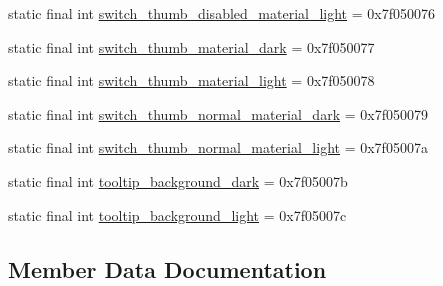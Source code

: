 \begin{DoxyCompactItemize}
\item 
static final int \mbox{\hyperlink{classandroid_1_1support_1_1v7_1_1appcompat_1_1R_1_1color_a489562997ece3fe0de5f8ab8e70813f2}{switch\+\_\+thumb\+\_\+disabled\+\_\+material\+\_\+light}} = 0x7f050076
\item 
static final int \mbox{\hyperlink{classandroid_1_1support_1_1v7_1_1appcompat_1_1R_1_1color_ab3f5b30d869ad8079583dcb3ca70c48a}{switch\+\_\+thumb\+\_\+material\+\_\+dark}} = 0x7f050077
\item 
static final int \mbox{\hyperlink{classandroid_1_1support_1_1v7_1_1appcompat_1_1R_1_1color_a7c510dd45c37c40591c33a8e683bba44}{switch\+\_\+thumb\+\_\+material\+\_\+light}} = 0x7f050078
\item 
static final int \mbox{\hyperlink{classandroid_1_1support_1_1v7_1_1appcompat_1_1R_1_1color_a6854a559785b1a0afe28f5a77b586c04}{switch\+\_\+thumb\+\_\+normal\+\_\+material\+\_\+dark}} = 0x7f050079
\item 
static final int \mbox{\hyperlink{classandroid_1_1support_1_1v7_1_1appcompat_1_1R_1_1color_a4b8ce6e9c94accbc194f64dc674513a0}{switch\+\_\+thumb\+\_\+normal\+\_\+material\+\_\+light}} = 0x7f05007a
\item 
static final int \mbox{\hyperlink{classandroid_1_1support_1_1v7_1_1appcompat_1_1R_1_1color_a265528155b2e1e4e6dd997513928e093}{tooltip\+\_\+background\+\_\+dark}} = 0x7f05007b
\item 
static final int \mbox{\hyperlink{classandroid_1_1support_1_1v7_1_1appcompat_1_1R_1_1color_aaebcd03ad73492f72e31f7ae1a5e949f}{tooltip\+\_\+background\+\_\+light}} = 0x7f05007c
\end{DoxyCompactItemize}


\subsection{Member Data Documentation}
\mbox{\label{classandroid_1_1support_1_1v7_1_1appcompat_1_1R_1_1color_a45abf46d211e98947a1719ec5c2e62e9}} 
